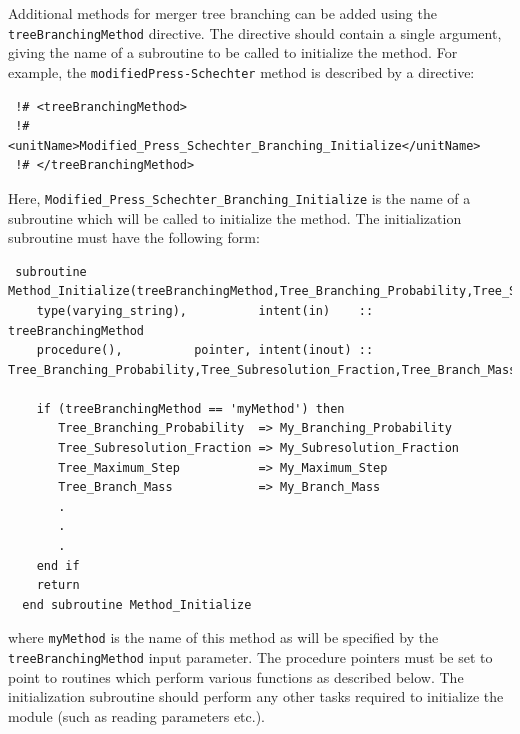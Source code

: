 Additional methods for merger tree branching can be added using the {\tt treeBranchingMethod} directive. The directive should contain a single argument, giving the name of a subroutine to be called to initialize the method. For example, the {\tt modifiedPress-Schechter} method is described by a directive:
\begin{verbatim}
 !# <treeBranchingMethod>
 !#  <unitName>Modified_Press_Schechter_Branching_Initialize</unitName>
 !# </treeBranchingMethod>
\end{verbatim}
Here, {\tt Modified\_Press\_Schechter\_Branching\_Initialize} is the name of a subroutine which will be called to initialize the method. The initialization subroutine must have the following form:
\begin{verbatim}
 subroutine Method_Initialize(treeBranchingMethod,Tree_Branching_Probability,Tree_Subresolution_Fraction,Tree_Branch_Mass,Tree_Maximum_Step)
    type(varying_string),          intent(in)    :: treeBranchingMethod
    procedure(),          pointer, intent(inout) :: Tree_Branching_Probability,Tree_Subresolution_Fraction,Tree_Branch_Mass,Tree_Maximum_Step
    
    if (treeBranchingMethod == 'myMethod') then
       Tree_Branching_Probability  => My_Branching_Probability
       Tree_Subresolution_Fraction => My_Subresolution_Fraction
       Tree_Maximum_Step           => My_Maximum_Step
       Tree_Branch_Mass            => My_Branch_Mass
       .
       .
       .
    end if
    return
  end subroutine Method_Initialize
\end{verbatim}
where {\tt myMethod} is the name of this method as will be specified by the {\tt treeBranchingMethod} input parameter. The procedure pointers must be set to point to routines which perform various functions as described below. The initialization subroutine should perform any other tasks required to initialize the module (such as reading parameters etc.).

